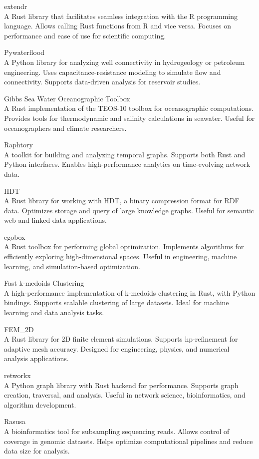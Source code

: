 \documentclass{article}
\begin{document}
extendr\\
A Rust library that facilitates seamless integration with the R programming language.
Allows calling Rust functions from R and vice versa. Focuses on performance and ease of use for
scientific computing.

Pywaterflood\\
A Python library for analyzing well connectivity in hydrogeology or petroleum
engineering. Uses capacitance-resistance modeling to simulate flow and connectivity. Supports
data-driven analysis for reservoir studies.

Gibbs Sea Water Oceanographic Toolbox\\
A Rust implementation of the TEOS-10 toolbox for
oceanographic computations. Provides tools for thermodynamic and salinity calculations in seawater.
Useful for oceanographers and climate researchers.

Raphtory\\
A toolkit for building and analyzing temporal graphs. Supports both Rust and Python
interfaces. Enables high-performance analytics on time-evolving network data.

HDT\\
A Rust library for working with HDT, a binary compression format for RDF data. Optimizes
storage and query of large knowledge graphs. Useful for semantic web and linked data applications.

egobox\\
A Rust toolbox for performing global optimization. Implements algorithms for efficiently
exploring high-dimensional spaces. Useful in engineering, machine learning, and simulation-based
optimization.

Fast k-medoids Clustering\\
A high-performance implementation of k-medoids clustering in Rust, with
Python bindings. Supports scalable clustering of large datasets. Ideal for machine learning and
data analysis tasks.

FEM\_2D\\
A Rust library for 2D finite element simulations. Supports hp-refinement for adaptive
mesh accuracy. Designed for engineering, physics, and numerical analysis applications.

retworkx\\
A Python graph library with Rust backend for performance. Supports graph creation,
traversal, and analysis. Useful in network science, bioinformatics, and algorithm development.

Rasusa\\
A bioinformatics tool for subsampling sequencing reads. Allows control of coverage in
genomic datasets. Helps optimize computational pipelines and reduce data size for analysis.
\end{document}
